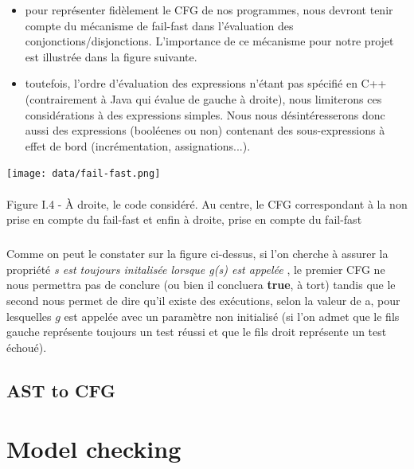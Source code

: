 \documentclass{report}
\begin{document}
\vspace{4mm}
\begin{itemize}
\item pour repr\'{e}senter fid\`{e}lement le CFG de nos programmes, nous devront tenir compte du m\'{e}canisme de fail-fast dans l'\'{e}valuation des conjonctions/disjonctions.
L'importance de ce m\'{e}canisme pour notre projet est illustr\'{e}e dans la figure suivante.\vspace{1mm}
\item toutefois, l'ordre d'\'{e}valuation des expressions n'\'{e}tant pas sp\'{e}cifi\'{e} en C++ (contrairement \`{a} Java qui \'{e}value de gauche \`{a} droite), nous limiterons ces consid\'{e}rations \`{a} des expressions simples. Nous nous d\'{e}sint\'{e}resserons donc aussi
des expressions (bool\'{e}enes ou non) contenant des sous-expressions \`{a} effet de bord (incr\'{e}mentation, assignations...).\vspace{1mm}
\end{itemize}

\begin{center}
\texttt{[image: data/fail-fast.png]}
~\\~\\Figure I.4 - \`{A} droite, le code consid\'{e}r\'{e}. Au centre, le CFG correspondant \`{a} la non prise en compte du fail-fast et enfin \`{a} droite, prise en compte du fail-fast
\end{center}

\paragraph{}
\hspace{4mm}\textnormal{Comme on peut le constater sur la figure ci-dessus, si l'on cherche \`{a} assurer la propri\'{e}t\'{e} \textit{\og s est toujours initalis\'{e}e lorsque g(s) est appel\'{e}e \fg{}}, le premier CFG ne nous permettra pas de conclure (ou bien il concluera \textbf{true}, \`{a} tort) tandis que le second nous permet de dire qu'il existe des ex\'{e}cutions, selon la valeur de a, 
pour lesquelles $g$ est appel\'{e}e avec un param\`{e}tre non initialis\'{e} (si l'on admet que le fils gauche repr\'{e}sente toujours un test r\'{e}ussi et que le fils droit repr\'{e}sente un test \'{e}chou\'{e}).}

\section{AST to CFG}

\chapter{Model checking}
\end{document}
